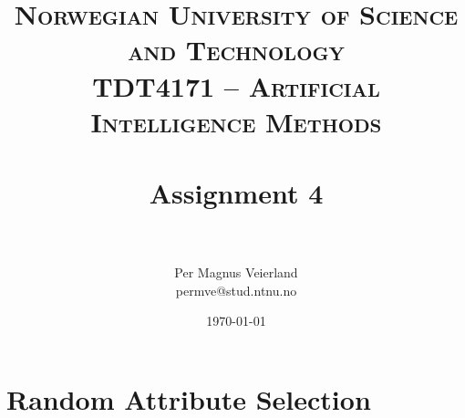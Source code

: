 

\title{	
\normalfont \normalsize 
\textsc{Norwegian University of Science and Technology\\TDT4171 -- Artificial Intelligence Methods} \\ [25pt]
\horrule{0.5pt} \\[0.4cm]
\huge Assignment 4 \\
\horrule{2pt} \\[0.5cm]
}

\author{Per Magnus Veierland\\permve@stud.ntnu.no}

\date{\normalsize\today}

\usepackage{float}
\usepackage{nicefrac}
\usepackage{dot2texi}
\usepackage{tikz}
\usetikzlibrary{shapes,arrows}


\maketitle

\section{Random Attribute Selection}

